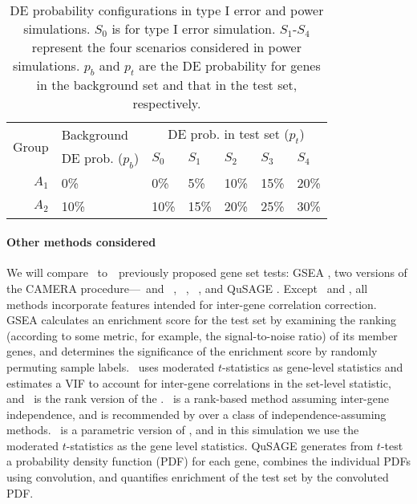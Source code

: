 	
	\begin{table}[!ht]
		\centering
		\caption[DE probability configurations in type I error and power simulations]{DE 
		probability configurations in type I error and power simulations. $S_0$ is for
			type I error simulation. $S_1$-$S_4$ represent the four scenarios considered in power 
			simulations. $p_b$ and $p_t$ are the DE probability for genes in the background set and 
			that in the test set, respectively.}
		
		\begin{tabular}{rp{3.7cm}p{1.5cm}p{1.5cm}p{1.5cm}p{1.5cm}p{1.5cm}}
			\hline
			\multirow{2}{*}{Group} & 	Background & \multicolumn{5}{c}{DE prob. in test set 
			($p_t$)}\\  \cline{3-7}
			&DE prob. ($p_b$)&$S_0$ &$S_1$ &$S_2$ &$S_3$ &$S_4$\\
		\hline
			$A_1$ & 0\% & 0\%  & 5\% & 10\% & 15\% & 20\%\\ 
			$A_2$ & 10\% & 10\% & 15\%& 20\%& 25\% & 30\%\\  
		\hline
		\end{tabular}
		
		\label{table:simusetup}
	\end{table}
	
	
	\paragraph{Other methods considered}
	
	We will compare \OurMethod~to~\HowmanyTest~previously proposed gene set tests: GSEA
	\citep{subramanian2005gene}, two versions of the CAMERA procedure---\CMT~and
	\CMR~\citep{wu2012camera}, \gent~\citep{tian2005discovering}, 
	\genr~\citep{michaud2008integrative},
	and QuSAGE \citep{yaari2013quantitative}. Except \gent~and \genr, all methods incorporate 
	features intended for inter-gene correlation correction. GSEA calculates an enrichment score 
	for the test set by examining the ranking (according to some metric, for example, the 
	signal-to-noise ratio) of its member genes, and determines the significance of the enrichment 
	score by randomly permuting sample labels. \CMT~uses moderated $t$-statistics 
	\citep{Smyth2004moderated} as gene-level statistics and estimates a VIF to account for 
	inter-gene correlations in the set-level statistic, and \CMR~is the rank version of the \CMT.
	\genr~is a rank-based method assuming inter-gene independence, and is recommended by 
	\citet{tarca2013comparison} over a class of independence-assuming methods. \gent~is a 
	parametric 
	version of \genr, and in this simulation we use the moderated $t$-statistics as the gene level 
	statistics. 
	QuSAGE generates
	from $t$-test a probability density function (PDF) for each gene, combines the individual PDFs 
	using
	convolution, and quantifies enrichment of the test set by the convoluted PDF. 
	
